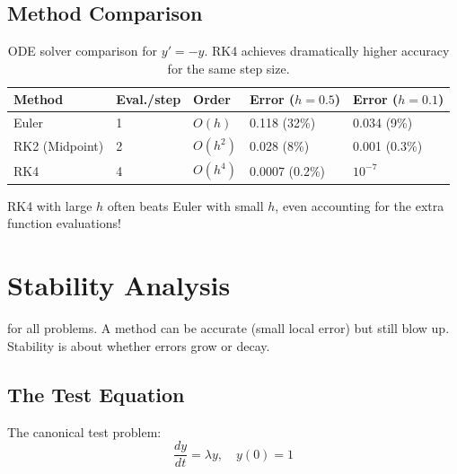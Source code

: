 \subsection{Method Comparison}

\begin{table}[ht]
\centering
\begin{tabular}{p{}p{}p{}p{}p{}}
\toprule
\textbf{Method} & \textbf{Eval./step} & \textbf{Order} & \textbf{Error ($h=0.5$)} & \textbf{Error ($h=0.1$)} \\
\midrule
Euler & 1 & $O(h)$ & 0.118 (32\%) & 0.034 (9\%) \\
RK2 (Midpoint) & 2 & $O(h^2)$ & 0.028 (8\%) & 0.001 (0.3\%) \\
RK4 & 4 & $O(h^4)$ & 0.0007 (0.2\%) & $10^{-7}$ \\
\bottomrule
\end{tabular}
\vspace{2em}
\caption{ODE solver comparison for $y' = -y$. RK4 achieves dramatically higher accuracy for the same step size.}
\label{tab:ode_method_comparison}
\end{table}


 RK4 with large $h$ often beats Euler with small $h$, even accounting for the extra function evaluations!




\newpage
\section{Stability Analysis}

 for all problems. A method can be accurate (small local error) but still blow up. Stability is about whether errors grow or decay.


\subsection{The Test Equation}

The canonical test problem:
\begin{equation}
    \frac{dy}{dt} = \lambda y, \quad y(0) = 1
\end{equation}

